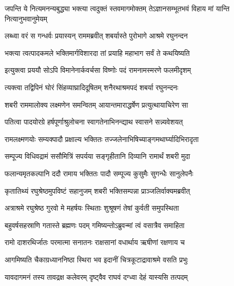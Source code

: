 \fourlineindentedshloka
{जपन्ति ये नित्यमनन्यबुद्ध्या}
{भक्त्या त्वदुक्तं स्तवमागमोक्तम्}
{तेऽज्ञानसम्भूतभवं विहाय}
{मां यान्ति नित्यानुभवानुमेयम्} %






\twolineshloka
{लब्ध्वा वरं स गन्धर्वः प्रयास्यन् राममब्रवीत्}
{शबर्यास्ते पुरोभागे आश्रमे रघुनन्दन} %

\twolineshloka
{भक्त्या त्वत्पादकमले भक्तिमार्गविशारदा}
{तां प्रयाहि महाभाग सर्वं ते कथयिष्यति} %

\twolineshloka
{इत्युक्त्वा प्रययौ सोऽपि विमानेनार्कवर्चसा}
{विष्णोः पदं रामनामस्मरणे फलमीदृशम्} %

\twolineshloka
{त्यक्त्वा तद्विपिनं घोरं सिंहव्याघ्रादिदूषितम्}
{शनैरथाश्रमपदं शबर्या रघुनन्दनः} %

\twolineshloka
{शबरी राममालोक्य लक्ष्मणेन समन्वितम्}
{आयान्तमाराद्धर्षेण प्रत्युत्थायाचिरेण सा} %

\twolineshloka
{पतित्वा पादयोरग्रे हर्षपूर्णाश्रुलोचना}
{स्वागतेनाभिनन्द्याथ स्वासने सन्न्यवेशयत्} %

\twolineshloka
{रामलक्ष्मणयोः सम्यक्पादौ प्रक्षाल्य भक्तितः}
{तज्जलेनाभिषिच्याङ्गमथार्घ्यादिभिरादृता} %

\twolineshloka
{सम्पूज्य विधिवद्रामं ससौमित्रिं सपर्यया}
{सङ्गृहीतानि दिव्यानि रामार्थं शबरी मुदा} %

\twolineshloka
{फलान्यमृतकल्पानि ददौ रामाय भक्तितः}
{पादौ सम्पूज्य कुसुमैः सुगन्धैः सानुलेपनैः} %

\twolineshloka
{कृतातिथ्यं रघुश्रेष्ठमुपविष्टं सहानुजम्}
{शबरी भक्तिसम्पन्ना प्राञ्जलिर्वाक्यमब्रवीत्} %

\twolineshloka
{अत्राश्रमे रघुश्रेष्ठ गुरवो मे महर्षयः}
{स्थिताः शुश्रूषणं तेषां कुर्वती समुपस्थिता} %

\twolineshloka
{बहुवर्षसहस्राणि गतास्ते ब्रह्मणः पदम्}
{गमिष्यन्तोऽब्रुवन्मां त्वं वसात्रैव समाहिता} %

\twolineshloka
{रामो दाशरथिर्जातः परमात्मा सनातनः}
{राक्षसानां वधार्थाय ऋषीणां रक्षणाय च} %

\twolineshloka
{आगमिष्यति चैकाग्रध्याननिष्ठा स्थिरा भव}
{इदानीं चित्रकूटाद्रावाश्रमे वसति प्रभुः} %

\twolineshloka
{यावदागमनं तस्य तावद्रक्ष कलेवरम्}
{दृष्ट्वैव राघवं दग्ध्वा देहं यास्यसि तत्पदम्} %

